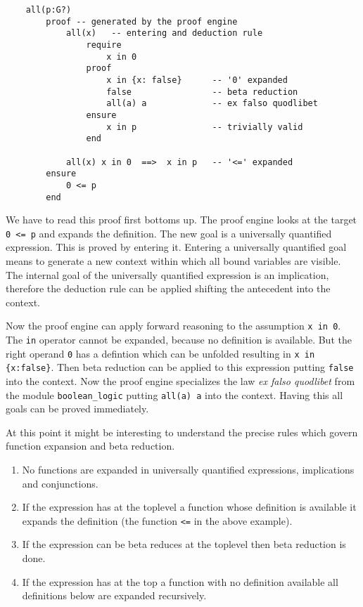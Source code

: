 \begin{lstlisting}
    all(p:G?)
        proof -- generated by the proof engine
            all(x)   -- entering and deduction rule
                require
                    x in 0
                proof
                    x in {x: false}      -- '0' expanded
                    false                -- beta reduction
                    all(a) a             -- ex falso quodlibet
                ensure
                    x in p               -- trivially valid
                end

            all(x) x in 0  ==>  x in p   -- '<=' expanded
        ensure
            0 <= p
        end
\end{lstlisting}
We have to read this proof first bottoms up. The proof engine looks at the
target \lstinline!0 <= p! and expands the definition. The new goal is a
universally quantified expression. This is proved by entering it. Entering a
universally quantified goal means to generate a new context within which all
bound variables are visible. The internal goal of the universally quantified
expression is an implication, therefore the deduction rule can be applied
shifting the antecedent into the context.

Now the proof engine can apply forward reasoning to the assumption
\lstinline!x in 0!. The \lstinline!in! operator cannot be expanded, because no
definition is available. But the right operand \lstinline!0! has a defintion
which can be unfolded resulting in \lstinline!x in {x:false}!. Then beta
reduction can be applied to this expression putting \lstinline!false! into the
context. Now the proof engine specializes the law {\em ex falso quodlibet}
from the module \lstinline!boolean_logic! putting \lstinline!all(a) a! into
the context. Having this all goals can be proved immediately.

At this point it might be interesting to understand the precise rules which
govern function expansion and beta reduction.

\begin{enumerate}
\item No functions are expanded in universally quantified expressions,
  implications and conjunctions.
\item If the expression has at the toplevel a function whose definition is
  available it expands the definition (the function \lstinline!<=! in the
  above example).
\item If the expression can be beta reduces at the toplevel then beta
  reduction is done.
\item If the expression has at the top a function with no definition available
  all definitions below are expanded recursively.
\end{enumerate}

